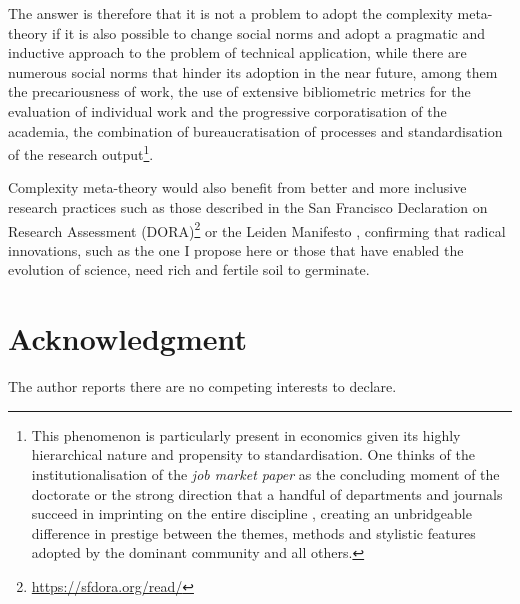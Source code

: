 \documentclass[a4paper, headings=standardclasses]{scrartcl}
\begin{document}
The answer is therefore that it is not a problem to adopt the complexity meta-theory if it is also possible to change social norms and adopt a pragmatic and inductive approach to the problem of technical application, while there are numerous social norms that hinder its adoption in the near future, among them the precariousness of work, the use of extensive bibliometric metrics for the evaluation of individual work and the progressive corporatisation of the academia, the combination of bureaucratisation of processes and standardisation of the research output\footnote{This phenomenon is particularly present in economics given its highly hierarchical nature and propensity to standardisation. One thinks of the institutionalisation of the \textit{job market paper} as the concluding moment of the doctorate or the strong direction that a handful of departments and journals succeed in imprinting on the entire discipline \parencite{heckman2020, aistleitner2023, baccini2023a}, creating an unbridgeable difference in prestige between the themes, methods and stylistic features adopted by the dominant community and all others.}.

Complexity meta-theory would also benefit from better and more inclusive research practices such as those described in the San Francisco Declaration on Research Assessment (DORA)\footnote{\url{https://sfdora.org/read/}} or the Leiden Manifesto \parencite{hicks2015}, confirming that radical innovations, such as the one I propose here or those that have enabled the evolution of science, need rich and fertile soil to germinate.

\section*{Acknowledgment}
The author reports there are no competing interests to declare.

\begin{refcontext}[sorting=nyt]
	\printbibliography
\end{refcontext}
\end{document}
